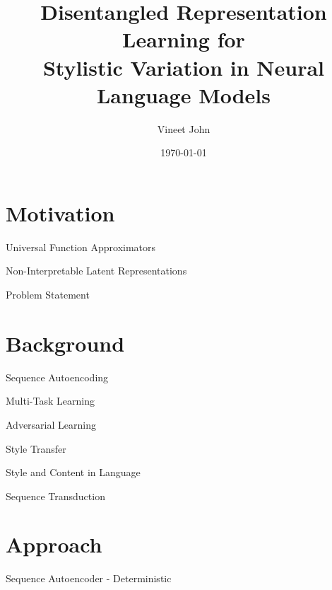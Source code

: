 \documentclass[aspectratio=169]{beamer}
\title{
        Disentangled Representation Learning for \\
        Stylistic Variation in Neural Language Models}
\date{\today}
\author{Vineet John}
\institute{University of Waterloo}
\begin{document}
\maketitle



\section{Motivation}

\begin{frame}{Universal Function Approximators}
\end{frame}

\begin{frame}{Non-Interpretable Latent Representations}
\end{frame}

\begin{frame}{Problem Statement}
\end{frame}

% 

\section{Background}

\begin{frame}{Sequence Autoencoding}
\end{frame}

\begin{frame}{Multi-Task Learning}
\end{frame}

\begin{frame}{Adversarial Learning}
\end{frame}

\begin{frame}{Style Transfer}
\end{frame}

\begin{frame}{Style and Content in Language}
\end{frame}

\begin{frame}{Sequence Transduction}
\end{frame}

% 

\section{Approach}

\begin{frame}{Sequence Autoencoder - Deterministic}
\end{frame}
\end{document}
